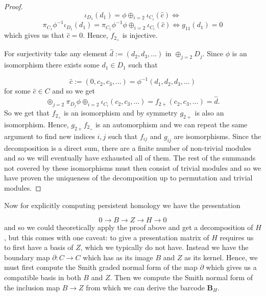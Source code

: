 \begin{proof}
  \[\iota_{D_{1}}(d_{1})= \phi \oplus_{i=2}\iota_{C_{i}}(\hat c) \iff
  \]
  \[
    \pi_{C_{1}} \phi^{-1} \iota_{D_{1}}(d_{1})=  \pi_{C_{1}} \phi^{-1} \phi \oplus_{i=2}\iota_{C_{i}}(\hat c) \iff
      g_{11}(d_{1}) = 0
    \]
    which gives us that $\hat c = 0$. Hence, $f_{2_{+}}$ is injective.

    For surjectivity take any element $\hat d := (d_{2},d_{3},\dots)$ in $\oplus_{j=2}D_{j}$. Since $\phi$ is an isomorphism there exists some $d_{1} \in D_{1}$ such that

    \[\hat c := (0,c_{2},c_{3},\dots) = \phi^{-1}(d_{1},d_{2},d_{3},\dots)\] for some $\hat c \in C$ and so we get
    \[\oplus_{j=2} \pi_{D_{j}} \phi \oplus_{i=2}\iota_{C_{i}} (c_{2},c_{3},\dots) = f_{2+}(c_{2},c_{3},\dots)= \hat d.
      \]
  So we get that $f_{2_{+}}$ is an isomorphism and by symmetry $g_{2+}$ is also an isomorphism. Hence, $g_{2+} f_{2_{+}}$ is an automorphism and we can repeat the same argument to find new indices $i,j$ such that $f_{ij}$ and $g_{ij}$ are isomorphisms. Since the decomposition is a direct sum, there are a finite number of non-trivial modules and so we will eventually have exhausted all of them. The rest of the summands not covered by these isomorphisms must then consist of trivial modules and so we have proven the uniqueness of the decomposition up to permutation and trivial modules.

\end{proof}
Now for explicitly computing persistent homology we have the presentation

\[
  0 \to B \to Z \to H \to 0
\]
and so we could theoretically apply the proof above and get a decomposition of $H$, but this comes with one caveat: to give a presentation matrix of $H$ requires us to first have a basis of $Z$, which we typically do not have. Instead we have the boundary map $\partial: C \to C$ which has as its image $B$ and $Z$ as its kernel. Hence, we must first compute the Smith graded normal form of the map $\partial$ which gives us a compatible basis in both $B$ and $Z$. Then we compute the Smith normal form of the inclusion map $B \to Z$ from which we can derive the barcode $\mathbf{B}_{H}$.

